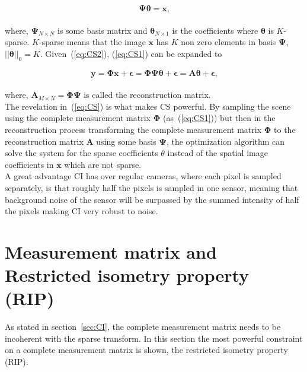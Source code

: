 \begin{equation}
\label{eq:CS2}
   \mathbf{ \Psi \theta = x }\text{,}
\end{equation}\\[0.1in]

where, $\mathbf{\Psi}_{N \times N}$ is some basis matrix and
$\mathbf{\theta}_{N\times1}$ is the coefficients where $\mathbf{\theta}$ is $K$-sparse. $K$-sparse means that the image $\mathbf{x}$ has $K$ non zero elements in basis $\mathbf{\Psi}$, $||\mathbf{\theta}||_0 = K$. Given~(\ref{eq:CS2}), (\ref{eq:CS1}) can be expanded to


\begin{equation}
   \mathbf{ y = \Phi x + \epsilon = \Phi \Psi \theta + \epsilon = A \theta + \epsilon }\text{,}
   \label{eq:CS}
\end{equation}\\[0.1in]

where, $\textbf{A}_{M \times N} = \mathbf{\Phi \Psi}$ is called the reconstruction matrix.\\[0.1in] 

The revelation in~(\ref{eq:CS}) is what makes CS powerful. By sampling the scene using the complete measurement matrix $\mathbf{\Phi}$ (as~(\ref{eq:CS1})) but then in the reconstruction process transforming the complete measurement matrix $\mathbf{\Phi}$ to the reconstruction matrix $\mathbf{A}$ using some basis $\mathbf{\Psi}$, the optimization algorithm can solve the system for the sparse coefficients $\theta$ instead of the spatial image coefficients in $\mathbf{x}$ which are not sparse.\cite{book:sm}\\[0.1in]

A great advantage CI has over regular cameras, where each pixel is sampled separately, is that roughly half the pixels is sampled in one sensor, meaning that background noise of the sensor will be surpassed by the summed intensity of half the pixels making CI very robust to noise.  


\section{Measurement matrix and Restricted isometry property (RIP)}
\label{sec:mm_RIP}
As stated in section~\ref{sec:CI}, the complete measurement matrix needs to be incoherent with the sparse transform. In this section the most powerful constraint on a complete measurement matrix is shown, the restricted isometry property (RIP). \\[0.1in]

